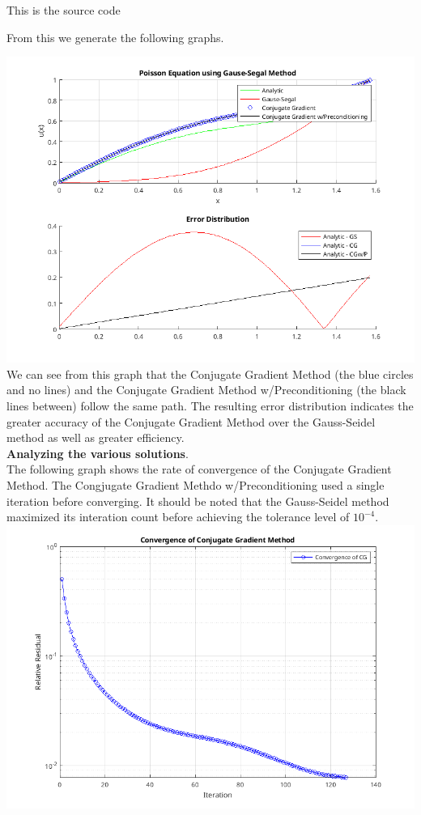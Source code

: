 \documentclass[12pt,a4paper]{report}
\begin{document}
This is the source code
	

From this we generate the following graphs.

\includegraphics[scale=0.5]{midterm_1.png} 
\\
We can see from this graph that the Conjugate Gradient Method (the blue circles and no lines) and the Conjugate Gradient Method w/Preconditioning (the black lines between) follow the same path.  The resulting error distribution indicates the greater accuracy of the Conjugate Gradient Method over the Gauss-Seidel method as well as greater efficiency. \\

\newpage
\noindent\textbf{Analyzing the various solutions}.\\

The following graph shows the rate of convergence of the Conjugate Gradient Method.  The Congjugate Gradient Methdo w/Preconditioning used a single iteration before converging.  It should be noted that the Gauss-Seidel method maximized its interation count before achieving the tolerance level of $10^{-4}$.\\  

\includegraphics[scale=0.5]{midterm_2.png} 
\end{document}
